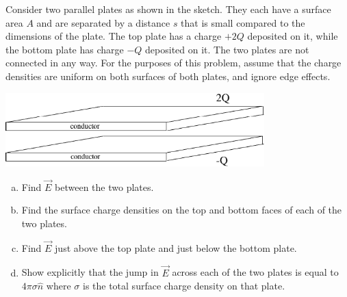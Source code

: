 \documentclass{esg8022pset}
\begin{document}
\begin{problem}{}
  Consider two parallel plates as shown in the sketch.  They each have a surface area $A$ and are separated by a distance $s$ that is small compared to the dimensions of the plate.  The top plate has a charge $+2Q$ deposited on it, while the bottom plate has charge $-Q$ deposited on it.  The two plates are not connected in any way.  For the purposes of this problem, assume that the charge densities are uniform on both surfaces of both plates, and ignore edge effects.
  \begin{center}\includegraphics[width=0.75\textwidth]{ps07_08}\end{center}
  \begin{enumerate}[(a)]
    \item Find $\vec E$ between the two plates.
    \item Find the surface charge densities on the top and bottom faces of each of the two plates.
    \item Find $\vec E$ just above the top plate and just below the bottom plate.
    \item Show explicitly that the jump in $\vec E$ across each of the two plates is equal to $4\pi \sigma \hat n$ where $\sigma$ is the total surface charge density on that plate.
  \end{enumerate}
\end{problem}
\end{document}
